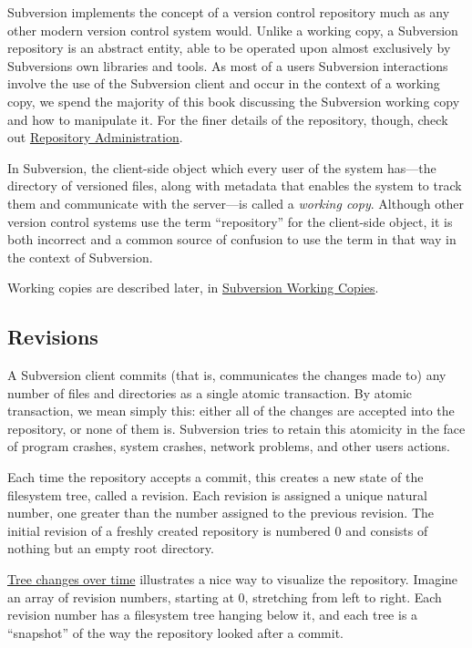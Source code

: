 Subversion implements the concept of a version control repository much
as any other modern version control system would. Unlike a working copy,
a Subversion repository is an abstract entity, able to be operated upon
almost exclusively by Subversion\textquotesingle s own libraries and
tools. As most of a user\textquotesingle s Subversion interactions
involve the use of the Subversion client and occur in the context of a
working copy, we spend the majority of this book discussing the
Subversion working copy and how to manipulate it. For the finer details
of the repository, though, check out
\hyperref[svn.reposadmin]{Repository Administration}.

\protect{}\label{svn.basic.svn-repositories.not-working-copy}
In Subversion, the client-side object which every user of the system
has---the directory of versioned files, along with metadata that enables
the system to track them and communicate with the server---is called a
\emph{working copy}. Although other version control systems use the term
``repository'' for the client-side object, it is both incorrect and a
common source of confusion to use the term in that way in the context of
Subversion.

Working copies are described later, in
\hyperref[svn.basic.in-action.wc]{Subversion Working Copies}.

\subsection{Revisions}\label{svn.basic.in-action.revs}

A Subversion client commits (that is, communicates the changes made to)
any number of files and directories as a single atomic transaction. By
atomic transaction, we mean simply this: either all of the changes are
accepted into the repository, or none of them is. Subversion tries to
retain this atomicity in the face of program crashes, system crashes,
network problems, and other users\textquotesingle{} actions.

Each time the repository accepts a commit, this creates a new state of
the filesystem tree, called a revision. Each revision is assigned a
unique natural number, one greater than the number assigned to the
previous revision. The initial revision of a freshly created repository
is numbered 0 and consists of nothing but an empty root directory.

\hyperref[svn.basic.in-action.revs.dia-1]{Tree changes over time}
illustrates a nice way to visualize the repository. Imagine an array of
revision numbers, starting at 0, stretching from left to right. Each
revision number has a filesystem tree hanging below it, and each tree is
a ``snapshot'' of the way the repository looked after a commit.


